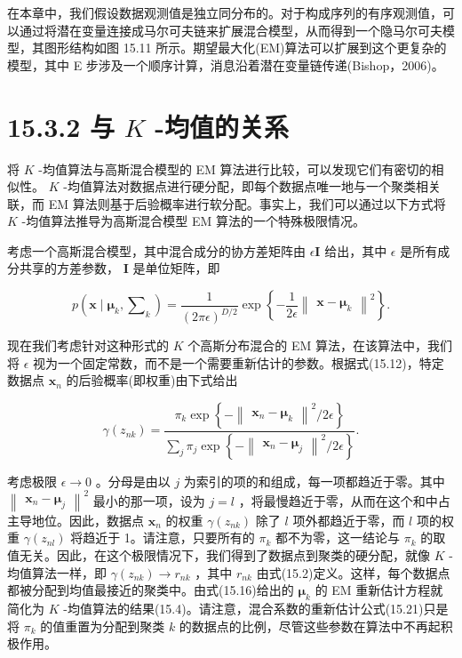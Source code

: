 \documentclass[10pt]{article}
\begin{document}
在本章中，我们假设数据观测值是独立同分布的。对于构成序列的有序观测值，可以通过将潜在变量连接成马尔可夫链来扩展混合模型，从而得到一个隐马尔可夫模型，其图形结构如图 15.11 所示。期望最大化(EM)算法可以扩展到这个更复杂的模型，其中 E 步涉及一个顺序计算，消息沿着潜在变量链传递(Bishop，2006)。

\section*{15.3.2 与 \(K\) -均值的关系}

将 \(K\) -均值算法与高斯混合模型的 EM 算法进行比较，可以发现它们有密切的相似性。 \(K\) -均值算法对数据点进行硬分配，即每个数据点唯一地与一个聚类相关联，而 EM 算法则基于后验概率进行软分配。事实上，我们可以通过以下方式将 \(K\) -均值算法推导为高斯混合模型 EM 算法的一个特殊极限情况。

考虑一个高斯混合模型，其中混合成分的协方差矩阵由 \(\epsilon \mathbf{I}\) 给出，其中 \(\epsilon\) 是所有成分共享的方差参数， \(\mathbf{I}\) 是单位矩阵，即

\[
p\left( {\mathbf{x} \mid  {\mathbf{\mu }}_{k},{\mathbf{\sum }}_{k}}\right)  = \frac{1}{{\left( 2\pi \epsilon \right) }^{D/2}}\exp \left\{  {-\frac{1}{2\epsilon }{\begin{Vmatrix}\mathbf{x} - {\mathbf{\mu }}_{k}\end{Vmatrix}}^{2}}\right\}  . \tag{15.31}
\]

现在我们考虑针对这种形式的 \(K\) 个高斯分布混合的 EM 算法，在该算法中，我们将 \(\epsilon\) 视为一个固定常数，而不是一个需要重新估计的参数。根据式(15.12)，特定数据点 \({\mathbf{x}}_{n}\) 的后验概率(即权重)由下式给出

\[
\gamma \left( {z}_{nk}\right)  = \frac{{\pi }_{k}\exp \left\{  {-{\begin{Vmatrix}{\mathbf{x}}_{n} - {\mathbf{\mu }}_{k}\end{Vmatrix}}^{2}/{2\epsilon }}\right\}  }{\mathop{\sum }\limits_{j}{\pi }_{j}\exp \left\{  {-{\begin{Vmatrix}{\mathbf{x}}_{n} - {\mathbf{\mu }}_{j}\end{Vmatrix}}^{2}/{2\epsilon }}\right\}  }. \tag{15.32}
\]

考虑极限 \(\epsilon  \rightarrow  0\) 。分母是由以 \(j\) 为索引的项的和组成，每一项都趋近于零。其中 \({\begin{Vmatrix}{\mathbf{x}}_{n} - {\mathbf{\mu }}_{j}\end{Vmatrix}}^{2}\) 最小的那一项，设为 \(j = l\) ，将最慢趋近于零，从而在这个和中占主导地位。因此，数据点 \({\mathbf{x}}_{n}\) 的权重 \(\gamma \left( {z}_{nk}\right)\) 除了 \(l\) 项外都趋近于零，而 \(l\) 项的权重 \(\gamma \left( {z}_{nl}\right)\) 将趋近于 1。请注意，只要所有的 \({\pi }_{k}\) 都不为零，这一结论与 \({\pi }_{k}\) 的取值无关。因此，在这个极限情况下，我们得到了数据点到聚类的硬分配，就像 \(K\) -均值算法一样，即 \(\gamma \left( {z}_{nk}\right)  \rightarrow  {r}_{nk}\) ，其中 \({r}_{nk}\) 由式(15.2)定义。这样，每个数据点都被分配到均值最接近的聚类中。由式(15.16)给出的 \({\mathbf{\mu }}_{k}\) 的 EM 重新估计方程就简化为 \(K\) -均值算法的结果(15.4)。请注意，混合系数的重新估计公式(15.21)只是将 \({\pi }_{k}\) 的值重置为分配到聚类 \(k\) 的数据点的比例，尽管这些参数在算法中不再起积极作用。
\end{document}

